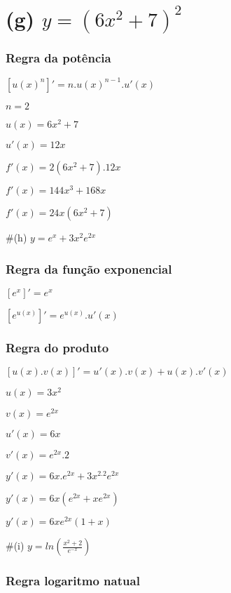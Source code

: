 \hypertarget{g-y6x272}{%
\section{\texorpdfstring{(g)
\(y=(6x^2+7)^2\)}{(g) y=(6x\^{}2+7)\^{}2}}\label{g-y6x272}}

\hypertarget{regra-da-potuxeancia}{%
\subsubsection{Regra da potência}\label{regra-da-potuxeancia}}

\([u(x)^n]'=n.u(x)^{n-1}.u'(x)\)

\(n=2\)

\(u(x)=6x^2+7\)

\(u'(x)=12x\)

\(f'(x)=2(6x^2+7).12x\)

\(f'(x)=144x^3+168x\)

\(f'(x)=24x(6x^2+7)\)

\#(h) \(y=e^x+3x^2e^{2x}\)

\hypertarget{regra-da-funuxe7uxe3o-exponencial}{%
\subsubsection{Regra da função
exponencial}\label{regra-da-funuxe7uxe3o-exponencial}}

\([e^x]'=e^x\)

\([e^{u(x)}]'=e^{u(x)}.u'(x)\)

\hypertarget{regra-do-produto-1}{%
\subsubsection{Regra do produto}\label{regra-do-produto-1}}

\([u(x).v(x)]'=u'(x).v(x)+u(x).v'(x)\)

\(u(x) = 3x^2\)

\(v(x) = e^{2x}\)

\(u'(x) = 6x\)

\(v'(x) = e^{2x}.2\)

\(y'(x)=6x.e^{2x}+3x^2.2e^{2x}\)

\(y'(x)=6x(e^{2x}+xe^{2x})\)

\(y'(x)=6xe^{2x}(1+x)\)

\#(i) \(y=ln(\frac{x^2+2}{e^{-x}})\)

\hypertarget{regra-logaritmo-natual}{%
\subsubsection{Regra logaritmo natual}\label{regra-logaritmo-natual}}

